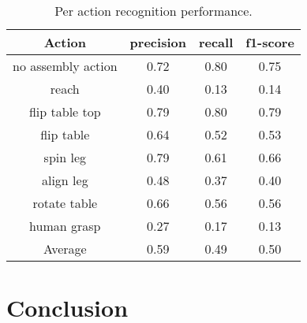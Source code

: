 \documentclass[letterpaper, 10 pt, conference, onecolumn]{IEEEtran}
\begin{document}
\begin{table}
    \caption{Per action recognition performance.}
    \centering
    \begin{tabular}{c c c c}
        \toprule
        \textbf{Action}    & \textbf{precision} & \textbf{recall} & \textbf{f1-score} \\
        \midrule
        no assembly action & 0.72               & 0.80            & 0.75 \\
        reach              & 0.40               & 0.13            & 0.14 \\
        flip table top     & 0.79               & 0.80            & 0.79 \\
        flip table         & 0.64               & 0.52            & 0.53 \\
        spin leg           & 0.79               & 0.61            & 0.66 \\
        align leg          & 0.48               & 0.37            & 0.40 \\
        rotate table       & 0.66               & 0.56            & 0.56 \\
        human grasp        & 0.27               & 0.17            & 0.13 \\
        \midrule
        Average            & 0.59               & 0.49            & 0.50 \\
        \bottomrule
    \end{tabular}
    \label{tab:results:per_action_performance}
\end{table}




\section{Conclusion}




\end{document}
